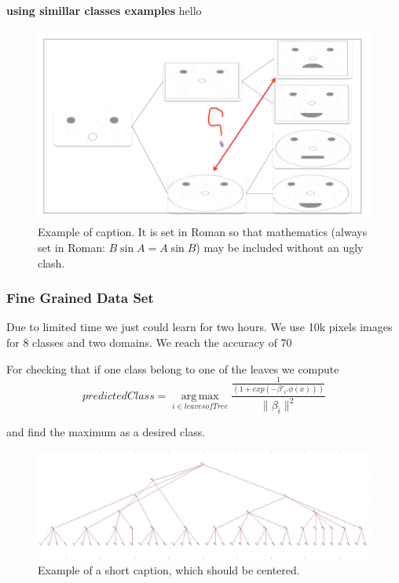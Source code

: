 \documentclass[10pt,twocolumn,letterpaper]{article}
\begin{document}
\textbf{using simillar classes examples}
hello

   
   
 \begin{figure}[t]
 	\begin{center}
 		\includegraphics[width=0.8\linewidth]{merge}
 	\end{center}
 	\caption{Example of caption.  It is set in Roman so that mathematics
 		(always set in Roman: $B \sin A = A \sin B$) may be included without an
 		ugly clash.}
 	\label{fig:long}
 	\label{fig:onecol}
 \end{figure}
 
 


 \subsubsection{Fine Grained Data Set}
Due to limited time we just could learn for two hours. We use 10k pixels images for 8 classes and two domains. We reach the accuracy of 70%

For checking that if one class belong to one of the leaves we compute 
\begin{displaymath}
predictedClass = \operatorname*{arg\,max}_{i \in leaves of Tree} 
\frac{\frac{1}{(1+exp(-\beta'_i.\phi(x)))}}{\|\beta_i\|^2}
\end{displaymath}  

and find the maximum as a desired class.

\begin{figure}
	\begin{center}
	    \includegraphics[width=1\linewidth]{carsDogs.png}
	\end{center}
	\caption{Example of a short caption, which should be centered.}
	\label{fig:short}
\end{figure}
{\small
  
  
}
\end{document}
